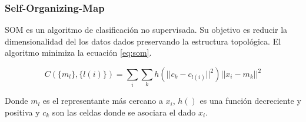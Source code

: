 \subsubsection{Self-Organizing-Map}

SOM es un algoritmo de clasificación no supervisada. Su objetivo es reducir la dimensionalidad del los datos dados preservando la estructura topológica. El algoritmo minimiza la ecuación \ref{eq:som}.

\begin{equation}
    C(\{m_l\},\{l(i)\}) = \sum_i \sum_k h(||c_k-c_{l(i)}||^2) ||x_i-m_k||^2
    \label{eq:som}
\end{equation}

Donde $m_l$ es el representante más cercano a $x_i$, $h()$ es una función decreciente y positiva y $c_k$ son las celdas donde se asociara el dado $x_i$.